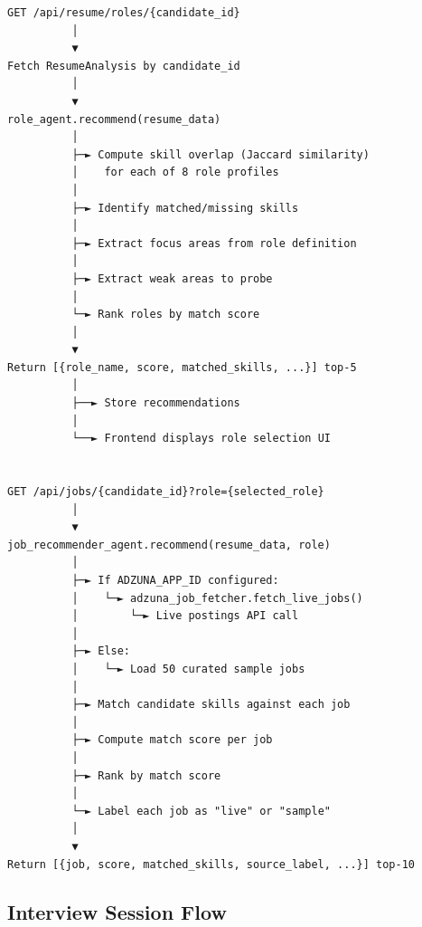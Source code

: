\documentclass[11pt]{article}
\begin{document}
\begin{verbatim}
GET /api/resume/roles/{candidate_id}
          │
          ▼
Fetch ResumeAnalysis by candidate_id
          │
          ▼
role_agent.recommend(resume_data)
          │
          ├─► Compute skill overlap (Jaccard similarity)
          │    for each of 8 role profiles
          │
          ├─► Identify matched/missing skills
          │
          ├─► Extract focus areas from role definition
          │
          ├─► Extract weak areas to probe
          │
          └─► Rank roles by match score
          │
          ▼
Return [{role_name, score, matched_skills, ...}] top-5
          │
          ├──► Store recommendations
          │
          └──► Frontend displays role selection UI


GET /api/jobs/{candidate_id}?role={selected_role}
          │
          ▼
job_recommender_agent.recommend(resume_data, role)
          │
          ├─► If ADZUNA_APP_ID configured:
          │    └─► adzuna_job_fetcher.fetch_live_jobs()
          │        └─► Live postings API call
          │
          ├─► Else:
          │    └─► Load 50 curated sample jobs
          │
          ├─► Match candidate skills against each job
          │
          ├─► Compute match score per job
          │
          ├─► Rank by match score
          │
          └─► Label each job as "live" or "sample"
          │
          ▼
Return [{job, score, matched_skills, source_label, ...}] top-10
\end{verbatim}

\subsection{Interview Session Flow}
\end{document}
